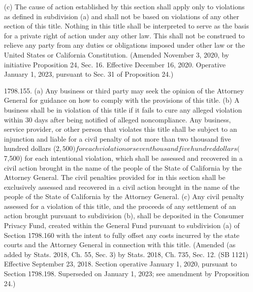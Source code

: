 (c) The cause of action established by this section shall apply only to violations as defined in subdivision (a) and shall not be based on violations of any other section of this title. Nothing in this title shall be interpreted to serve as the basis for a private right of action under any other law. This shall not be construed to relieve any party from any duties or obligations imposed under other law or the United States or California Constitution.
(Amended November 3, 2020, by initiative Proposition 24, Sec. 16. Effective December 16, 2020. Operative January 1, 2023, pursuant to Sec. 31 of Proposition 24.)

1798.155.  (a) Any business or third party may seek the opinion of the Attorney General for guidance on how to comply with the provisions of this title.
(b) A business shall be in violation of this title if it fails to cure any alleged violation within 30 days after being notified of alleged noncompliance. Any business, service provider, or other person that violates this title shall be subject to an injunction and liable for a civil penalty of not more than two thousand five hundred dollars ($2,500) for each violation or seven thousand five hundred dollars ($7,500) for each intentional violation, which shall be assessed and recovered in a civil action brought in the name of the people of the State of California by the Attorney General. The civil penalties provided for in this section shall be exclusively assessed and recovered in a civil action brought in the name of the people of the State of California by the Attorney General.
(c) Any civil penalty assessed for a violation of this title, and the proceeds of any settlement of an action brought pursuant to subdivision (b), shall be deposited in the Consumer Privacy Fund, created within the General Fund pursuant to subdivision (a) of Section 1798.160 with the intent to fully offset any costs incurred by the state courts and the Attorney General in connection with this title.
(Amended (as added by Stats. 2018, Ch. 55, Sec. 3) by Stats. 2018, Ch. 735, Sec. 12. (SB 1121) Effective September 23, 2018. Section operative January 1, 2020, pursuant to Section 1798.198. Superseded on January 1, 2023; see amendment by Proposition 24.)

